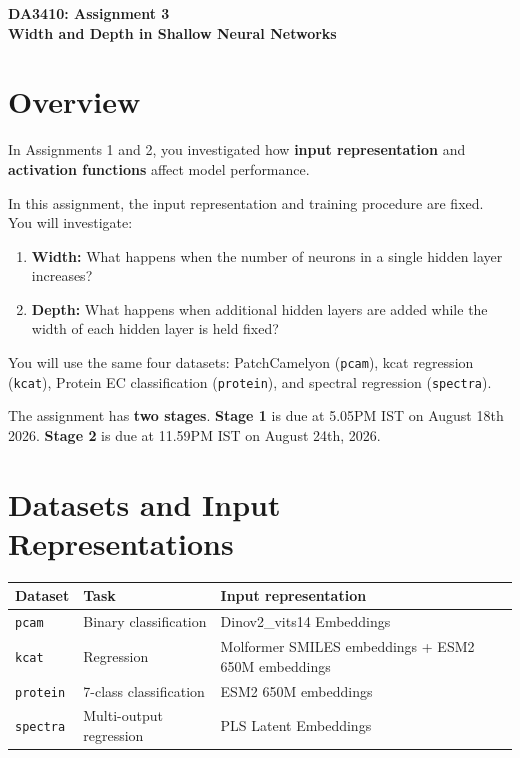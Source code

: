 \documentclass[11pt,a4paper]{article}
\newcommand{\code}[1]{\texttt{#1}}
\begin{document}
\begin{center}
    {\LARGE \textbf{DA3410: Assignment 3}}\\[0.4em]
    {\Large \textbf{Width and Depth in Shallow Neural Networks}}\\[1em]
\end{center}

\section{Overview}

In Assignments 1 and 2, you investigated how \textbf{input representation} and \textbf{activation functions} affect model performance.

In this assignment, the input representation and training procedure are fixed. You will investigate:

\begin{enumerate}
    \item \textbf{Width:} What happens when the number of neurons in a single hidden layer increases?
    \item \textbf{Depth:} What happens when additional hidden layers are added while the width of each hidden layer is held fixed?
\end{enumerate}

You will use the same four datasets: PatchCamelyon (\code{pcam}), kcat regression (\code{kcat}), Protein EC classification (\code{protein}), and spectral regression (\code{spectra}).

The assignment has \textbf{two stages}. \textbf{Stage 1} is due at 5.05PM IST on August 18th 2026. \textbf{Stage 2} is due at 11.59PM IST on August 24th, 2026.

\section{Datasets and Input Representations}

\begin{center}
\begin{tabular}{p{} p{} p{}}
\toprule
\textbf{Dataset} & \textbf{Task} & \textbf{Input representation} \\
\midrule
\code{pcam} & Binary classification & Dinov2\_vits14 Embeddings \\
\code{kcat} & Regression & Molformer SMILES embeddings + ESM2 650M embeddings \\
\code{protein} & 7-class classification & ESM2 650M embeddings \\
\code{spectra} & Multi-output regression &  PLS Latent Embeddings\\
\bottomrule
\end{tabular}
\end{center}
\end{document}
